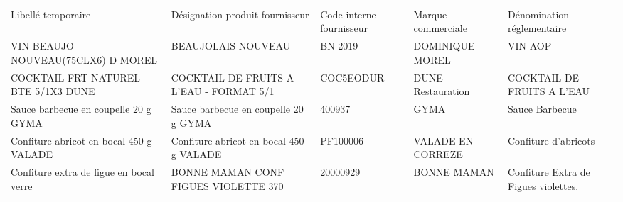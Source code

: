 \begin{tabular}{p{4cm}p{4cm}p{2cm}p{2cm}p{3cm}}
\toprule
                      Libellé temporaire &          Désignation produit fournisseur & Code interne fournisseur & Marque commerciale &            Dénomination réglementaire \\
      VIN BEAUJO NOUVEAU(75CLX6) D MOREL &                       BEAUJOLAIS NOUVEAU &                  BN 2019 &    DOMINIQUE MOREL &                              VIN  AOP \\
\midrule
     COCKTAIL FRT NATUREL BTE 5/1X3 DUNE &  COCKTAIL DE FRUITS A L'EAU - FORMAT 5/1 &                COC5EODUR &  DUNE Restauration &            COCKTAIL DE FRUITS A L'EAU \\
    Sauce barbecue en coupelle 20 g GYMA &     Sauce barbecue en coupelle 20 g GYMA &                   400937 &               GYMA &                        Sauce Barbecue \\
 Confiture abricot en bocal 450 g VALADE &  Confiture abricot en bocal 450 g VALADE &                 PF100006 &  VALADE EN CORREZE &                  Confiture d'abricots \\
 Confiture extra de figue en bocal verre &  BONNE MAMAN CONF FIGUES VIOLETTE    370 &                 20000929 &        BONNE MAMAN &  Confiture Extra de Figues violettes. \\
\bottomrule
\end{tabular}
